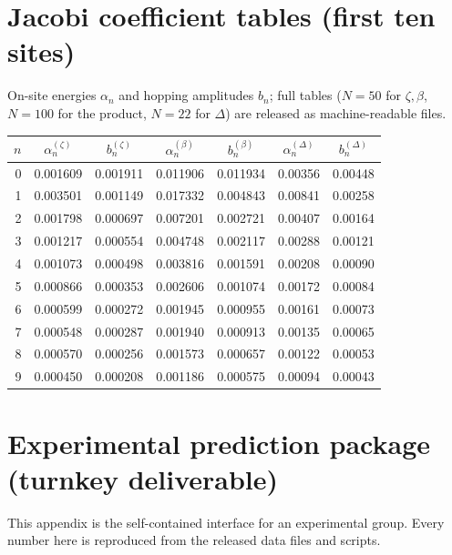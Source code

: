 \documentclass[aps,prx,reprint,floatfix]{revtex4-2}
\begin{document}
\section{Jacobi coefficient tables (first ten sites)}
\label{app:coeffs}
On-site energies $\alpha_n$ and hopping amplitudes $b_n$; full tables
($N=50$ for $\zeta,\beta$, $N=100$ for the product, $N=22$ for $\Delta$)
are released as machine-readable files.

\begin{center}\small
\begin{tabular}{r|cc|cc|cc}
\toprule
$n$ & $\alpha_n^{(\zeta)}$ & $b_n^{(\zeta)}$
    & $\alpha_n^{(\beta)}$ & $b_n^{(\beta)}$
    & $\alpha_n^{(\Delta)}$ & $b_n^{(\Delta)}$\\
\midrule
0 & 0.001609 & 0.001911 & 0.011906 & 0.011934 & 0.00356 & 0.00448\\
1 & 0.003501 & 0.001149 & 0.017332 & 0.004843 & 0.00841 & 0.00258\\
2 & 0.001798 & 0.000697 & 0.007201 & 0.002721 & 0.00407 & 0.00164\\
3 & 0.001217 & 0.000554 & 0.004748 & 0.002117 & 0.00288 & 0.00121\\
4 & 0.001073 & 0.000498 & 0.003816 & 0.001591 & 0.00208 & 0.00090\\
5 & 0.000866 & 0.000353 & 0.002606 & 0.001074 & 0.00172 & 0.00084\\
6 & 0.000599 & 0.000272 & 0.001945 & 0.000955 & 0.00161 & 0.00073\\
7 & 0.000548 & 0.000287 & 0.001940 & 0.000913 & 0.00135 & 0.00065\\
8 & 0.000570 & 0.000256 & 0.001573 & 0.000657 & 0.00122 & 0.00053\\
9 & 0.000450 & 0.000208 & 0.001186 & 0.000575 & 0.00094 & 0.00043\\
\bottomrule
\end{tabular}
\end{center}

\section{Experimental prediction package (turnkey deliverable)}
\label{app:protocol}

This appendix is the self-contained interface for an experimental group.
Every number here is reproduced from the released data files and scripts.
\end{document}
